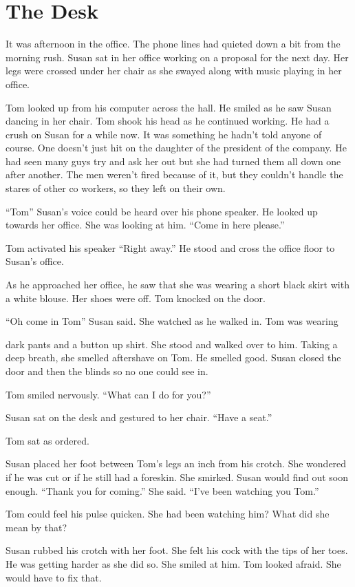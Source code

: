 \section{The Desk}

It was afternoon in the office. The phone lines had quieted down a bit from the morning rush. Susan sat in her office working on a proposal for the next day. Her legs were crossed under her chair as she swayed along with music playing in her office.

Tom looked up from his computer across the hall. He smiled as he saw Susan dancing in her chair. Tom shook his head as he continued working. He had a crush on Susan for a while now. It was something he hadn’t told anyone of course. One doesn’t just hit on the daughter of the president of the company. He had seen many guys try and ask her out but she had turned them all down one after another. The men weren’t fired because of it, but they couldn’t handle the stares of other co workers, so they left on their own.

“Tom” Susan’s voice could be heard over his phone speaker. He looked up towards her office. She was looking at him. “Come in here please.”

Tom activated his speaker “Right away.” He stood and cross the office floor to Susan’s office.

As he approached her office, he saw that she was wearing a short black skirt with a white blouse. Her shoes were off. Tom knocked on the door.

“Oh come in Tom” Susan said. She watched as he walked in. Tom was wearing

dark pants and a button up shirt. She stood and walked over to him. Taking a deep breath, she smelled aftershave on Tom. He smelled good. Susan closed the door and then the blinds so no one could see in.

Tom smiled nervously. “What can I do for you?”

Susan sat on the desk and gestured to her chair. “Have a seat.”

Tom sat as ordered.

Susan placed her foot between Tom’s legs an inch from his crotch. She wondered if he was cut or if he still had a foreskin. She smirked. Susan would find out soon enough. “Thank you for coming.” She said. “I’ve been watching you Tom.”

Tom could feel his pulse quicken. She had been watching him? What did she mean by that?

Susan rubbed his crotch with her foot. She felt his cock with the tips of her toes. He was getting harder as she did so. She smiled at him. Tom looked afraid. She would have to fix that.

